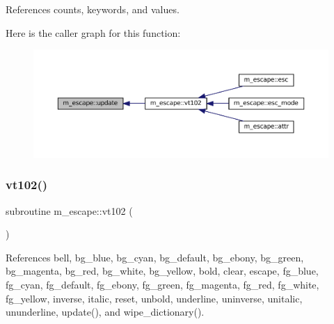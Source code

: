 References counts, keywords, and values.

Here is the caller graph for this function\+:\nopagebreak
\begin{figure}[H]
\begin{center}
\leavevmode
\includegraphics[width=350pt]{namespacem__escape_a5efd612f60d281003917329484a7960c_icgraph}
\end{center}
\end{figure}
\mbox{\label{namespacem__escape_ae9d40717b2e75e90e2505d5fed6435c5}} 
\subsubsection{\texorpdfstring{vt102()}{vt102()}}
{\footnotesize\ttfamily subroutine m\+\_\+escape\+::vt102 (\begin{DoxyParamCaption}{ }\end{DoxyParamCaption})\hspace{0.3cm}{\ttfamily [private]}}



References bell, bg\+\_\+blue, bg\+\_\+cyan, bg\+\_\+default, bg\+\_\+ebony, bg\+\_\+green, bg\+\_\+magenta, bg\+\_\+red, bg\+\_\+white, bg\+\_\+yellow, bold, clear, escape, fg\+\_\+blue, fg\+\_\+cyan, fg\+\_\+default, fg\+\_\+ebony, fg\+\_\+green, fg\+\_\+magenta, fg\+\_\+red, fg\+\_\+white, fg\+\_\+yellow, inverse, italic, reset, unbold, underline, uninverse, unitalic, ununderline, update(), and wipe\+\_\+dictionary().

